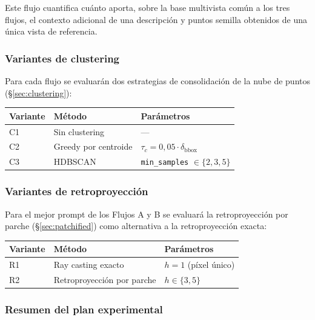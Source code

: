 Este flujo cuantifica cuánto aporta, sobre la base multivista común a los tres
flujos, el contexto adicional de una descripción y puntos semilla obtenidos de
una única vista de referencia.

\subsubsection{Variantes de clustering}

Para cada flujo se evaluarán dos estrategias de consolidación de la nube de
puntos (§\ref{sec:clustering}):

\begin{center}
\begin{tabular}{lll}
\toprule
Variante & Método & Parámetros \\
\midrule
C1 & Sin clustering & — \\
C2 & Greedy por centroide & $\tau_c = 0{,}05 \cdot \delta_{\text{bbox}}$ \\
C3 & HDBSCAN & \texttt{min\_samples} $\in \{2, 3, 5\}$ \\
\bottomrule
\end{tabular}
\end{center}

\subsubsection{Variantes de retroproyección}

Para el mejor prompt de los Flujos A y B se evaluará la retroproyección por
parche (§\ref{sec:patchified}) como alternativa a la retroproyección exacta:

\begin{center}
\begin{tabular}{lll}
\toprule
Variante & Método & Parámetros \\
\midrule
R1 & Ray casting exacto & $h = 1$ (píxel único) \\
R2 & Retroproyección por parche & $h \in \{3, 5\}$ \\
\bottomrule
\end{tabular}
\end{center}

\subsubsection{Resumen del plan experimental}

